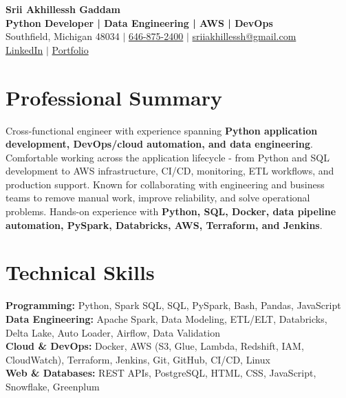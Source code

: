 \documentclass[letterpaper,10pt]{article}
\begin{document}
\fontsize{9.35pt}{10.45pt}\selectfont

\begin{center}
    {\LARGE \textbf{Srii Akhillessh Gaddam}} \\[-1pt]
    \textbf{Python Developer | Data Engineering | AWS | DevOps} \\[2pt]
    Southfield, Michigan 48034 $|$
    \href{tel:6468752400}{646-875-2400} $|$
    \href{mailto:sriiakhillessh@gmail.com}{sriiakhillessh@gmail.com} \\[1pt]
    \href{https://www.linkedin.com/in/srii-akhiilessh-gaddam-b48668191/}{LinkedIn} $|$
    \href{https://sriiakhillesshg.github.io/portfolio/}{Portfolio}
\end{center}
\vspace{-8pt}

\section{Professional Summary}
\small{Cross-functional engineer with experience spanning \textbf{Python application development, DevOps/cloud automation, and data engineering}. Comfortable working across the application lifecycle - from Python and SQL development to AWS infrastructure, CI/CD, monitoring, ETL workflows, and production support. Known for collaborating with engineering and business teams to remove manual work, improve reliability, and solve operational problems. Hands-on experience with \textbf{Python, SQL, Docker, data pipeline automation, PySpark, Databricks, AWS, Terraform, and Jenkins}.}

\section{Technical Skills}
\small{
\textbf{Programming:} Python, Spark SQL, SQL, PySpark, Bash, Pandas, JavaScript \\
\textbf{Data Engineering:} Apache Spark, Data Modeling, ETL/ELT, Databricks, Delta Lake, Auto Loader, Airflow, Data Validation \\
\textbf{Cloud \& DevOps:} Docker, AWS (S3, Glue, Lambda, Redshift, IAM, CloudWatch), Terraform, Jenkins, Git, GitHub, CI/CD, Linux \\
\textbf{Web \& Databases:} REST APIs, PostgreSQL, HTML, CSS, JavaScript, Snowflake, Greenplum
}
\end{document}
